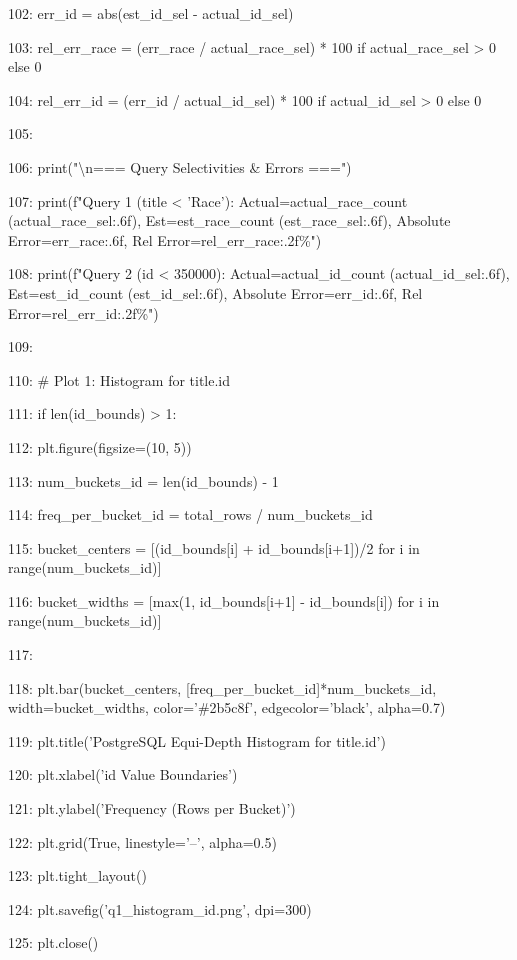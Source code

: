 \documentclass[11pt,a4paper]{article}
\begin{document}
{102:     err\_id = abs(est\_id\_sel - actual\_id\_sel)

103:     rel\_err\_race = (err\_race / actual\_race\_sel) * 100 if actual\_race\_sel > 0 else 0

104:     rel\_err\_id = (err\_id / actual\_id\_sel) * 100 if actual\_id\_sel > 0 else 0

105:

106:     print("\textbackslash{}n=== Query Selectivities \& Errors ===")

107:     print(f"Query 1 (title < 'Race'): Actual={actual\_race\_count} ({actual\_race\_sel:.6f}), Est={est\_race\_count} ({est\_race\_sel:.6f}), Absolute Error={err\_race:.6f}, Rel Error={rel\_err\_race:.2f}\%")

108:     print(f"Query 2 (id < 350000): Actual={actual\_id\_count} ({actual\_id\_sel:.6f}), Est={est\_id\_count} ({est\_id\_sel:.6f}), Absolute Error={err\_id:.6f}, Rel Error={rel\_err\_id:.2f}\%")

109:

110:     \# Plot 1: Histogram for title.id

111:     if len(id\_bounds) > 1:

112:         plt.figure(figsize=(10, 5))

113:         num\_buckets\_id = len(id\_bounds) - 1

114:         freq\_per\_bucket\_id = total\_rows / num\_buckets\_id

115:         bucket\_centers = [(id\_bounds[i] + id\_bounds[i+1])/2 for i in range(num\_buckets\_id)]

116:         bucket\_widths = [max(1, id\_bounds[i+1] - id\_bounds[i]) for i in range(num\_buckets\_id)]

117:

118:         plt.bar(bucket\_centers, [freq\_per\_bucket\_id]*num\_buckets\_id, width=bucket\_widths, color='\#2b5c8f', edgecolor='black', alpha=0.7)

119:         plt.title('PostgreSQL Equi-Depth Histogram for title.id')

120:         plt.xlabel('id Value Boundaries')

121:         plt.ylabel('Frequency (Rows per Bucket)')

122:         plt.grid(True, linestyle='--', alpha=0.5)

123:         plt.tight\_layout()

124:         plt.savefig('q1\_histogram\_id.png', dpi=300)

125:         plt.close()

}
\end{document}
